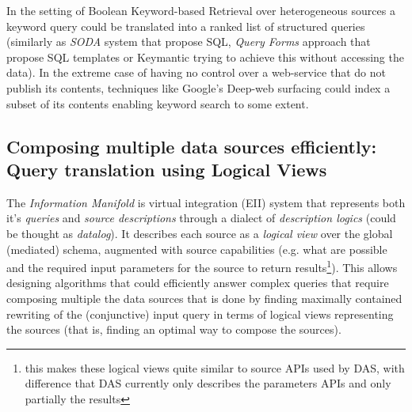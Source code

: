In the setting of Boolean Keyword-based Retrieval over heterogeneous sources a keyword query could be translated into a ranked list of structured queries (similarly as \textit{SODA} system that propose SQL, \textit{Query Forms} approach that propose SQL templates or Keymantic trying to achieve this without accessing the data).
In the extreme case of having no control over a web-service that do not publish its contents, techniques like Google's Deep-web surfacing could index a subset of its contents enabling keyword search to some extent.

\subsection{Composing multiple data sources efficiently: Query translation using Logical Views\label{IM_query_translation}}
The \textit{Information Manifold}\cite{Levy96} is virtual integration (EII) system that represents  both it's \textit{queries} and \textit{source descriptions} through a dialect of \textit{description logics} (could be thought as \textit{datalog}).  It describes each source as a \textit{logical view} over the global (mediated) schema, augmented with source capabilities (e.g. what are possible and the required input parameters for the source to return results\footnote{this makes these logical views quite similar to source APIs used by DAS, with difference that DAS currently only describes the parameters APIs and only partially the results}).
%
This allows designing algorithms that could efficiently answer complex queries that require composing multiple the data sources that is done by finding maximally contained rewriting of the (conjunctive) input query in terms of logical views representing the sources (that is, finding an optimal way to compose the sources).

